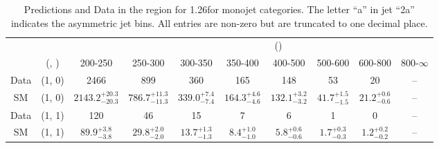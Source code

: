 \begin{table}[h!]
\tiny
\centering
\caption{Predictions and Data in the \mj region for 1.26\ifb for monojet categories. The letter ``a'' in jet \eg ``2a''  indicates the asymmetric jet bins. All entries are non-zero but are truncated to one decimal place.\label{tab:yieldsallpost_mu_comb_mono}}
\begin{tabular}
{cccccccccc}
	\hline\hline
&	&	& \multicolumn{8}{c}{\scalht (\gev)}\\ 
	&	 (\njet, \nb) & 200-250 & 250-300 & 300-350 & 350-400 & 400-500 & 500-600 & 600-800 & 800-$\infty$ \\ [0.8ex] 
\hline
	Data & (1, 0) & 2466 & 899 & 360 & 165 & 148 & 53 & 20 & -- \\[0.5ex] 
	SM & (1, 0) & $2143.2^{+ 20.3 }_{- 20.3 }$ & $786.7^{+ 11.3 }_{- 11.3 }$ & $339.0^{+ 7.4 }_{- 7.4 }$ & $164.3^{+ 4.6 }_{- 4.6 }$ & $132.1^{+ 3.2 }_{- 3.2 }$ & $41.7^{+ 1.5 }_{- 1.5 }$ & $21.2^{+ 0.6 }_{- 0.6 }$ & -- \\[0.5ex] 
	Data & (1, 1) & 120 & 46 & 15 & 7 & 6 & 1 & 0 & -- \\[0.5ex] 
	SM & (1, 1) & $89.9^{+ 3.8 }_{- 3.8 }$ & $29.8^{+ 2.0 }_{- 2.0 }$ & $13.7^{+ 1.3 }_{- 1.3 }$ & $8.4^{+ 1.0 }_{- 1.0 }$ & $5.8^{+ 0.6 }_{- 0.6 }$ & $1.7^{+ 0.3 }_{- 0.3 }$ & $1.2^{+ 0.2 }_{- 0.2 }$ & -- \\[0.5ex] 
	\hline
	\hline
\end{tabular}
\end{table}
